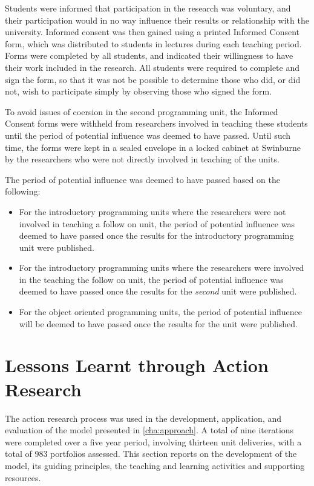 Students were informed that participation in the research was voluntary, and their participation would in no way influence their results or relationship with the university. Informed consent was then gained using a printed Informed Consent form, which was distributed to students in lectures during each teaching period. Forms were completed by all students, and indicated their willingness to have their work included in the research. All students were required to complete and sign the form, so that it was not be possible to determine those who did, or did not, wish to participate simply by observing those who signed the form.

To avoid issues of coersion in the second programming unit, the Informed Consent forms were withheld from researchers involved in teaching these students until the period of potential influence was deemed to have passed. Until such time, the forms were kept in a sealed envelope in a locked cabinet at Swinburne by the researchers who were not directly involved in teaching of the units.

The period of potential influence was deemed to have passed based on the following:
\begin{itemize}[noitemsep,nolistsep]
	\item For the introductory programming units where the researchers were not involved in teaching a follow on unit, the period of potential influence was deemed to have passed once the results for the introductory programming unit were published.
	\item For the introductory programming units where the researchers were involved in the teaching the follow on unit, the period of potential influence was deemed to have passed once the results for the \emph{second} unit were published.
	\item For the object oriented programming units, the period of potential influence will be deemed to have passed once the results for the unit were published.
\end{itemize}


\clearpage
\section{Lessons Learnt through Action Research} %
\label{sec:lessons_learnt_from_action_research}

The action research process was used in the development, application, and evaluation of the model presented in \cref{cha:approach}. A total of nine iterations were completed over a five year period, involving thirteen unit deliveries, with a total of 983 portfolios assessed. This section reports on the development of the model, its guiding principles, the teaching and learning activities and supporting resources.

